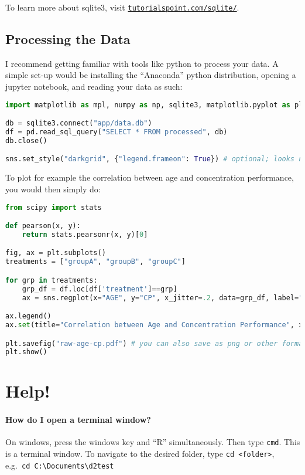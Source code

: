 \documentclass[a4paper,11pt,british,oneside]{article}
\begin{document}
To learn more about sqlite3, visit \href{https://www.tutorialspoint.com/sqlite/}{\nolinkurl{tutorialspoint.com/sqlite/}}.

\subsection{Processing the Data}

I recommend getting familiar with tools like python to process your data. A simple set-up would be installing the \enquote{Anaconda} python distribution, opening a jupyter notebook, and reading your data as such:

\begin{lstlisting}[language=python]
import matplotlib as mpl, numpy as np, sqlite3, matplotlib.pyplot as plt, pandas as pd, seaborn as sns

db = sqlite3.connect("app/data.db")
df = pd.read_sql_query("SELECT * FROM processed", db)
db.close()

sns.set_style("darkgrid", {"legend.frameon": True}) # optional; looks nice
\end{lstlisting}

To plot for example the correlation between age and concentration performance, you would then simply do:

\begin{lstlisting}[language=python]
from scipy import stats

def pearson(x, y):
	return stats.pearsonr(x, y)[0]

fig, ax = plt.subplots()
treatments = ["groupA", "groupB", "groupC"]

for grp in treatments:
	grp_df = df.loc[df['treatment']==grp]
	ax = sns.regplot(x="AGE", y="CP", x_jitter=.2, data=grp_df, label="{} (r = {})".format(grp, round(pearson(grp_df["AGE"], grp_df["CP"]),3)))

ax.legend()
ax.set(title="Correlation between Age and Concentration Performance", xlabel="Age", ylabel="Concentration Performance")

plt.savefig("raw-age-cp.pdf") # you can also save as png or other formats
plt.show()
\end{lstlisting}

\section{Help!}

\paragraph{How do I open a terminal window?} On windows, press the windows key and \enquote{R} simultaneously. Then type \texttt{cmd}. This is a terminal window. To navigate to the desired folder, type \texttt{cd <folder>}, e.g.\ \texttt{cd C:\textbackslash{}Documents\textbackslash{}d2test}
\end{document}
